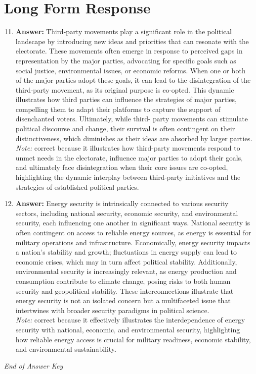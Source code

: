 \documentclass[12pt]{article}
\begin{document}
\section*{Long Form Response}
\begin{enumerate}[label=\arabic*.]
\setcounter{enumi}{10}
\item \textbf{Answer:} Third-party movements play a significant role in the political landscape by introducing new ideas and priorities that can resonate with the electorate. These movements often emerge in response to perceived gaps in representation by the major parties, advocating for specific goals such as social justice, environmental issues, or economic reforms. When one or both of the major parties adopt these goals, it can lead to the disintegration of the third-party movement, as its original purpose is co-opted. This dynamic illustrates how third parties can influence the strategies of major parties, compelling them to adapt their platforms to capture the support of disenchanted voters. Ultimately, while third- party movements can stimulate political discourse and change, their survival is often contingent on their distinctiveness, which diminishes as their ideas are absorbed by larger parties.
\\ \textit{Note:} correct because it illustrates how third-party movements respond to unmet needs in the electorate, influence major parties to adopt their goals, and ultimately face disintegration when their core issues are co-opted, highlighting the dynamic interplay between third-party initiatives and the strategies of established political parties.
\item \textbf{Answer:} Energy security is intrinsically connected to various security sectors, including national security, economic security, and environmental security, each influencing one another in significant ways. National security is often contingent on access to reliable energy sources, as energy is essential for military operations and infrastructure. Economically, energy security impacts a nation's stability and growth; fluctuations in energy supply can lead to economic crises, which may in turn affect political stability. Additionally, environmental security is increasingly relevant, as energy production and consumption contribute to climate change, posing risks to both human security and geopolitical stability. These interconnections illustrate that energy security is not an isolated concern but a multifaceted issue that intertwines with broader security paradigms in political science.
\\ \textit{Note:} correct because it effectively illustrates the interdependence of energy security with national, economic, and environmental security, highlighting how reliable energy access is crucial for military readiness, economic stability, and environmental sustainability.
\end{enumerate}

\vfill
\noindent\textit{End of Answer Key}
\end{document}
